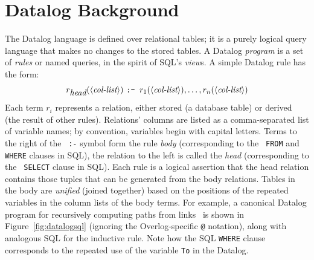 \newpage
\appendix
\section{Datalog Background}
\label{app:datalog}

The Datalog language is defined over relational tables; it is a purely logical query language that makes no changes to the stored tables. A Datalog {\em program} is a set of {\em rules} or named queries, in the spirit of SQL's {\em view}s.  A simple Datalog rule has the form:
\[
	r_{\mbox{\em head}}(\langle\mbox{\em col-list}\rangle) \mbox{{ \tt :- }} r_1(\langle\mbox{{\em col-list}}\rangle), \ldots, r_n(\langle\mbox{{\em col-list}}\rangle)
\]
Each term $r_i$ represents a relation, either stored (a database
table) or derived (the result of other rules).  Relations' columns are
listed as a comma-separated list of variable names; by convention,
variables begin with capital letters.  Terms to the right of the {\tt
  :-} symbol form the rule {\em body} (corresponding to the {\tt
  \small FROM} and {\tt \small WHERE} clauses in SQL), the relation to
the left is called the {\em head} (corresponding to the {\tt \small
  SELECT} clause in SQL).  Each rule is a logical assertion that the
head relation contains those tuples that can be generated from the
body relations.  Tables in the body are {\em unified} (joined
together) based on the positions of the repeated variables in the
column lists of the body terms.  For example, a canonical Datalog
program for recursively computing paths from links~\cite{loo-sigmod06}
is shown in Figure~\ref{fig:datalogsql} (ignoring the Overlog-specific
{\tt @} notation), along with analogous SQL for the inductive rule.
Note how the SQL {\tt \small WHERE} clause corresponds to the repeated
use of the variable {\tt \small To} in the Datalog.

